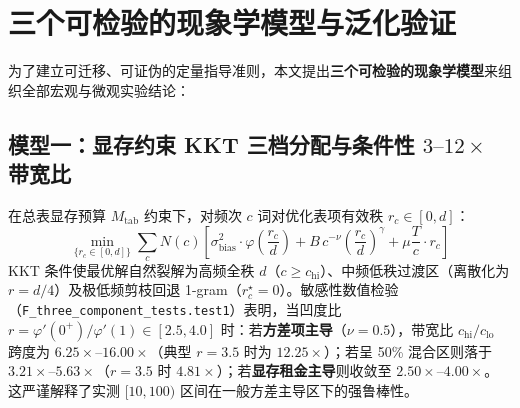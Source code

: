 \documentclass[10.5pt,a4paper]{ctexart}
\begin{document}
\section{三个可检验的现象学模型与泛化验证}

为了建立可迁移、可证伪的定量指导准则，本文提出\textbf{三个可检验的现象学模型}来组织全部宏观与微观实验结论：

\subsection{模型一：显存约束 KKT 三档分配与条件性 \texorpdfstring{$3\text{--}12\times$}{3-12x} 带宽比}
在总表显存预算 $M_{\text{tab}}$ 约束下，对频次 $c$ 词对优化表项有效秩 $r_c \in [0, d]$：
\begin{equation}
\min_{\{r_c \in [0, d]\}} \sum_c N(c)\left[\sigma_{\text{bias}}^2\cdot \varphi\!\left(\frac{r_c}{d}\right) + B\, c^{-\nu} \left(\frac{r_c}{d}\right)^\gamma + \mu \frac{T}{c} \cdot r_c\right]
\end{equation}
KKT 条件使最优解自然裂解为高频全秩 $d$（$c \ge c_{\text{hi}}$）、中频低秩过渡区（离散化为 $r=d/4$）及极低频剪枝回退 1-gram（$r_c^\star=0$）。敏感性数值检验（\texttt{F\_three\_component\_tests.test1}）表明，当凹度比 $r=\varphi'(0^+)/\varphi'(1) \in [2.5, 4.0]$ 时：若\textbf{方差项主导}（$\nu=0.5$），带宽比 $c_{\text{hi}}/c_{\text{lo}}$ 跨度为 $6.25\times\text{--}16.00\times$（典型 $r=3.5$ 时为 $12.25\times$）；若呈 50\% 混合区则落于 $3.21\times\text{--}5.63\times$（$r=3.5$ 时 $4.81\times$）；若\textbf{显存租金主导}则收敛至 $2.50\times\text{--}4.00\times$。这严谨解释了实测 $[10, 100)$ 区间在一般方差主导区下的强鲁棒性。
\end{document}

